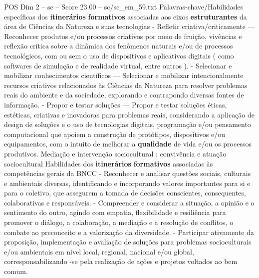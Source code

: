 \begin{textsample}{POS Dim 2 – sc – Score 23.00 – sc/sc\_em\_59.txt}
Palavras-chave/Habilidades específicas dos \textbf{itinerários} \textbf{formativos} associadas aos eixos \textbf{estruturantes} da área de Ciências da Natureza e suas tecnologias - Refletir criativa/criticamente — Reconhecer produtos e/ou processos criativos por meio de fruição, vivências e reflexão crítica sobre a dinâmica dos fenômenos naturais e/ou de processos tecnológicos, com ou sem o uso de dispositivos e aplicativos digitais ( como softwares de simulação e de realidade virtual, entre outros ). - Selecionar e mobilizar conhecimentos científicos — Selecionar e mobilizar intencionalmente recursos criativos relacionados às Ciências da Natureza para resolver problemas reais do ambiente e da sociedade, explorando e contrapondo diversas fontes de informação. - Propor e testar soluções — Propor e testar soluções éticas, estéticas, criativas e inovadoras para problemas reais, considerando a aplicação de design de soluções e o uso de tecnologias digitais, programação e/ou pensamento computacional que apoiem a construção de protótipos, dispositivos e/ou equipamentos, com o intuito de melhorar a \textbf{qualidade} de vida e/ou os processos produtivos.
Mediação e intervenção sociocultural : convivência e atuação sociocultural Habilidades dos \textbf{itinerários} \textbf{formativos} associadas às competências gerais da BNCC - Reconhecer e analisar questões sociais, culturais e ambientais diversas, identificando e incorporando valores importantes para si e para o coletivo, que assegurem a tomada de decisões conscientes, consequentes, colaborativas e responsáveis. - Compreender e considerar a situação, a opinião e o sentimento do outro, agindo com empatia, flexibilidade e resiliência para promover o diálogo, a colaboração, a mediação e a resolução de conflitos, o combate ao preconceito e a valorização da diversidade. - Participar ativamente da proposição, implementação e avaliação de soluções para problemas socioculturais e/ou ambientais em nível local, regional, nacional e/ou global, corresponsabilizando -se pela realização de ações e projetos voltados ao bem comum.

\end{textsample}
